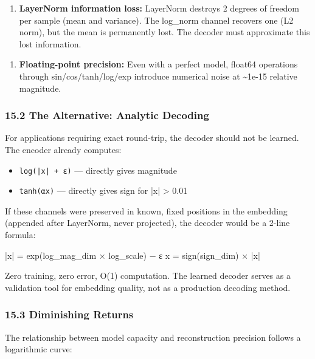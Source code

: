 \documentclass[11pt]{article}
\begin{document}
\begin{enumerate}
\item \textbf{LayerNorm information loss:} LayerNorm destroys 2 degrees of freedom per sample (mean and variance). The log\_norm channel recovers one (L2 norm), but the mean is permanently lost. The decoder must approximate this lost information.
\end{enumerate}


\begin{enumerate}
\item \textbf{Floating-point precision:} Even with a perfect model, float64 operations through sin/cos/tanh/log/exp introduce numerical noise at \textasciitilde{}1e-15 relative magnitude.
\end{enumerate}


\subsubsection*{15.2 The Alternative: Analytic Decoding}


For applications requiring exact round-trip, the decoder should not be learned. The encoder already computes:

\begin{itemize}
\item \texttt{log(|x| + ε)} — directly gives magnitude
\item \texttt{tanh(αx)} — directly gives sign for |x| > 0.01
\end{itemize}


If these channels were preserved in known, fixed positions in the embedding (appended after LayerNorm, never projected), the decoder would be a 2-line formula:


\begin{CodeBlock}
|x| = exp(log_mag_dim × log_scale) − ε
x   = sign(sign_dim) × |x|
\end{CodeBlock}


Zero training, zero error, O(1) computation. The learned decoder serves as a validation tool for embedding quality, not as a production decoding method.


\subsubsection*{15.3 Diminishing Returns}


The relationship between model capacity and reconstruction precision follows a logarithmic curve:
\end{document}
